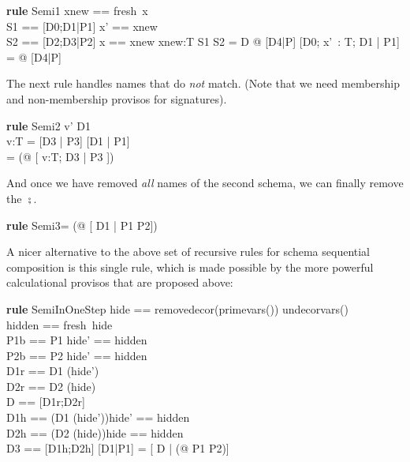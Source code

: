 \documentclass{article}
\newenvironment{zedrule}[1]{\par\textbf{rule }#1\vspace{-2ex}\infrule}{\endinfrule}
\newcommand{\derives}{\derive{}}
\newcommand{\substitute}{\mathrel{\curvearrowleft}}  %
\newcommand{\proviso}{\raisebox{0.5ex}{${}_{\blacktriangleright}\ $}}%
\begin{document}
\begin{zedrule}{Semi1}
  \proviso xnew == fresh~x \\
  \proviso S1 == [D0;D1|P1] \substitute \lblot x' == xnew \rblot \\
  \proviso S2 == [D2;D3|P2] \substitute \lblot x == xnew \rblot
  xnew:T \vdash S1 \semi S2 = \exists D @ [D4|P]
\derives
  [D0; x'~: T; D1 | P1] \semi [D2; x:T; D3 | P2]\\
      = \exists [xnew:T; D] @ [D4|P]
\end{zedrule}

The next rule handles names that do \emph{not} match. 
(Note that we need membership and non-membership provisos for signatures).
\begin{zedrule}{Semi2}
  \proviso v' \not\in D1 \\
  v:T \vdash [D1 | P1] \semi [D2 | P2] = [D3 | P3]
\derives
  [D1 | P1] \semi [v:T ; D2 | P2]\\
    = (\exists [] @ [ v:T; D3 | P3 ])
\end{zedrule}

And once we have removed \emph{all} names of the second
schema, we can finally remove the $\semi$.
\begin{zedrule}{Semi3}
  [D1 | P1] \semi [~|P2] = (\exists [] @ [ D1 | P1 \land P2])
\end{zedrule}

A nicer alternative to the above set of recursive rules for
schema sequential composition is this single rule, which is
made possible by the more powerful calculational provisos that
are proposed above:

\begin{zedrule}{SemiInOneStep}
  \proviso hide == removedecor(primevars(\alpha[D1])) 
                   \cap undecorvars(\alpha[D2]) \\
  \proviso hidden == fresh~hide \\
  \proviso P1b == P1 \substitute \lblot hide' == hidden \rblot \\
  \proviso P2b == P2 \substitute \lblot hide' == hidden \rblot \\
  \proviso D1r == D1 \hide (hide') \\
  \proviso D2r == D2 \hide (hide) \\
  \proviso D == [D1r;D2r] \\
  \proviso D1h == (D1 \filter(hide'))\substitute\lblot hide' == hidden \rblot\\
  \proviso D2h == (D2 \filter(hide))\substitute\lblot hide == hidden \rblot\\
  \proviso D3 == [D1h;D2h]
  \derives
  [D1|P1] \semi [D2|P2] = [ D | (\exists [D3] @ P1 \land P2)] 
\end{zedrule}
\end{document}
